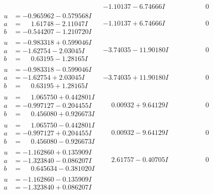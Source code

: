 \documentclass[1p]{elsarticle_modified}
\theoremstyle{definition}
\begin{document}
$$\begin{array}{c|c|c}
 & -1.10137 - 6.74666 I & \phantom{-0.000000 } 0 \\ \hline\begin{aligned}
u &= -0.965962 - 0.579568 I \\
a &= \phantom{-}1.61748 - 2.11047 I \\
b &= -0.544207 - 1.210720 I\end{aligned}
 & -1.10137 + 6.74666 I & \phantom{-0.000000 } 0 \\ \hline\begin{aligned}
u &= -0.983318 + 0.599046 I \\
a &= -1.62754 - 2.03045 I \\
b &= \phantom{-}0.63195 - 1.28165 I\end{aligned}
 & -3.74035 - 11.90180 I & \phantom{-0.000000 } 0 \\ \hline\begin{aligned}
u &= -0.983318 - 0.599046 I \\
a &= -1.62754 + 2.03045 I \\
b &= \phantom{-}0.63195 + 1.28165 I\end{aligned}
 & -3.74035 + 11.90180 I & \phantom{-0.000000 } 0 \\ \hline\begin{aligned}
u &= \phantom{-}1.065750 + 0.442801 I \\
a &= -0.997127 - 0.204455 I \\
b &= \phantom{-}0.456080 + 0.926673 I\end{aligned}
 & \phantom{-}0.00932 + 9.64129 I & \phantom{-0.000000 } 0 \\ \hline\begin{aligned}
u &= \phantom{-}1.065750 - 0.442801 I \\
a &= -0.997127 + 0.204455 I \\
b &= \phantom{-}0.456080 - 0.926673 I\end{aligned}
 & \phantom{-}0.00932 - 9.64129 I & \phantom{-0.000000 } 0 \\ \hline\begin{aligned}
u &= -1.162860 + 0.135909 I \\
a &= -1.323840 - 0.086207 I \\
b &= \phantom{-}0.645634 - 0.381020 I\end{aligned}
 & \phantom{-}2.61757 - 0.40705 I & \phantom{-0.000000 } 0 \\ \hline\begin{aligned}
u &= -1.162860 - 0.135909 I \\
a &= -1.323840 + 0.086207 I \\

\end{aligned}
\end{array}$$
\end{document}
